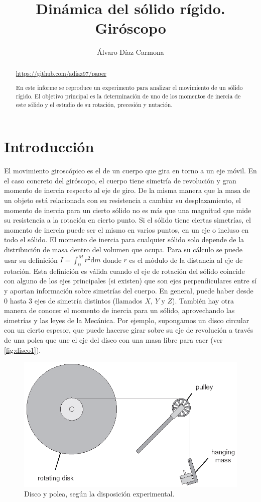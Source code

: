 \documentclass[a4paper]{article}
\begin{document}
\title{Dinámica del sólido rígido. Giróscopo}
\author{Álvaro Díaz Carmona}
\maketitle
\begin{abstract}
\url{https://github.com/adiaz97/paper}

En este informe se reproduce un experimento para analizar el movimiento de un sólido rígido. El objetivo principal es la determinación de uno de los momentos de inercia de este sólido y el estudio de su rotación, precesión y nutación.

\end{abstract}

\section{Introducción}
El movimiento giroscópico es el de un cuerpo que gira en torno a un eje móvil. En el caso concreto del giróscopo, el cuerpo tiene simetría de revolución y gran momento de inercia respecto al eje de giro. 
De la misma manera que la masa de un objeto está relacionada con su resistencia a cambiar su desplazamiento, el momento de inercia para un cierto sólido no es más que una magnitud que mide su resistencia a la rotación en cierto punto. Si el sólido tiene ciertas simetrías, el momento de inercia puede ser el mismo en varios puntos, en un eje o incluso en todo el sólido. El momento de inercia para cualquier sólido solo depende de la distribución de masa dentro del volumen que ocupa. Para su cálculo se puede usar su definición $I=\int^{M}_{0} r^2\mathrm{d}m$ donde $r$ es el módulo de la distancia al eje de rotación. Esta definición es válida cuando el eje de rotación del sólido coincide con alguno de los ejes principales (si existen) que son ejes perpendiculares entre sí y aportan información sobre simetrías del cuerpo. En general, puede haber desde 0 hasta 3 ejes de simetría distintos (llamados $X$, $Y$ y $Z$). 
También hay otra manera de conocer el momento de inercia para un sólido, aprovechando las simetrías y las leyes de la Mecánica. Por ejemplo, supongamos un disco circular con un cierto espesor, que puede hacerse girar sobre su eje de revolución a través de una polea que une el eje del disco con una masa libre para caer (ver \autoref{fig:disco1}).
\begin{figure}[h]
\begin{center}
\includegraphics[width=10 cm]{disco1.png}
\caption{Disco y polea, según la disposición experimental.}
\label{fig:disco1}
\end{center}
\end{figure}
\end{document}
